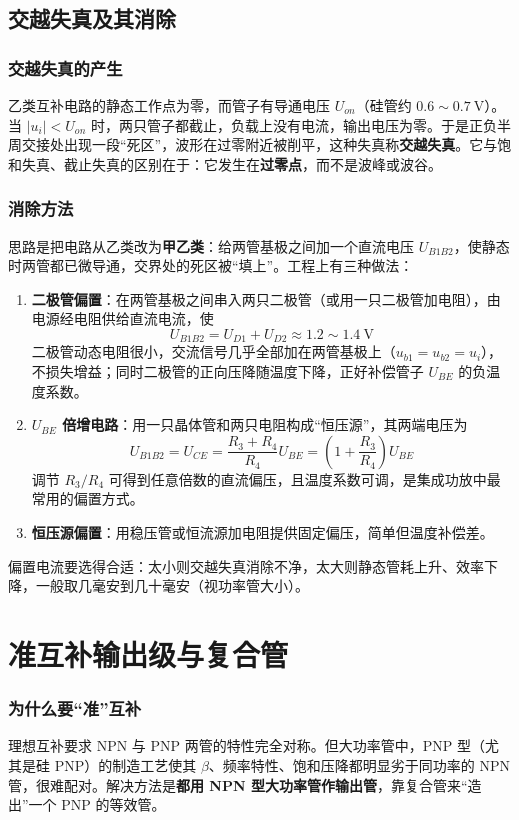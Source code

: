 \subsection{交越失真及其消除}
\subsubsection{交越失真的产生}
乙类互补电路的静态工作点为零，而管子有导通电压 $U_{on}$（硅管约 $0.6\sim0.7\ \mathrm{V}$）。当 $|u_i|<U_{on}$ 时，两只管子都截止，负载上没有电流，输出电压为零。于是正负半周交接处出现一段“死区”，波形在过零附近被削平，这种失真称\textbf{交越失真}。它与饱和失真、截止失真的区别在于：它发生在\textbf{过零点}，而不是波峰或波谷。

\subsubsection{消除方法}
思路是把电路从乙类改为\textbf{甲乙类}：给两管基极之间加一个直流电压 $U_{B1B2}$，使静态时两管都已微导通，交界处的死区被“填上”。工程上有三种做法：
\begin{enumerate}
    \item \textbf{二极管偏置}：在两管基极之间串入两只二极管（或用一只二极管加电阻），由电源经电阻供给直流电流，使
    \begin{equation}
    U_{B1B2}=U_{D1}+U_{D2}\approx1.2\sim1.4\ \mathrm{V}
    \end{equation}
    二极管动态电阻很小，交流信号几乎全部加在两管基极上（$u_{b1}=u_{b2}=u_i$），不损失增益；同时二极管的正向压降随温度下降，正好补偿管子 $U_{BE}$ 的负温度系数。
    \item \textbf{$U_{BE}$ 倍增电路}：用一只晶体管和两只电阻构成“恒压源”，其两端电压为
    \begin{equation}
    U_{B1B2}=U_{CE}=\frac{R_3+R_4}{R_4}U_{BE}
    =\left(1+\frac{R_3}{R_4}\right)U_{BE}
    \end{equation}
    调节 $R_3/R_4$ 可得到任意倍数的直流偏压，且温度系数可调，是集成功放中最常用的偏置方式。
    \item \textbf{恒压源偏置}：用稳压管或恒流源加电阻提供固定偏压，简单但温度补偿差。
\end{enumerate}
偏置电流要选得合适：太小则交越失真消除不净，太大则静态管耗上升、效率下降，一般取几毫安到几十毫安（视功率管大小）。

\section{准互补输出级与复合管}
\subsubsection{为什么要“准”互补}
理想互补要求 NPN 与 PNP 两管的特性完全对称。但大功率管中，PNP 型（尤其是硅 PNP）的制造工艺使其 $\beta$、频率特性、饱和压降都明显劣于同功率的 NPN 管，很难配对。解决方法是\textbf{都用 NPN 型大功率管作输出管}，靠复合管来“造出”一个 PNP 的等效管。

